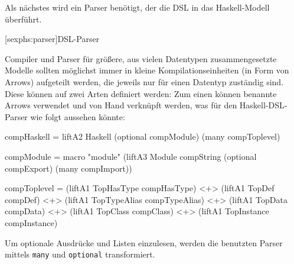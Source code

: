 \documentclass[12pt, a4paper, bibgerm]{scrbook}
\newenvironment{DIFnomarkup}{}{}
\newcommand\icode[1]{\lstinline?#1?}
\newcommand\lsection{}
\begin{document}
Als nächstes wird ein Parser benötigt, der die DSL in das
Haskell-Modell überführt.

\lsection[sexphs:parser]{DSL-Parser}

Compiler und Parser für größere, aus vielen Datentypen zusammengesetzte
Modelle sollten möglichst immer in kleine Kompilationseinheiten (in Form
von Arrows) aufgeteilt werden, die jeweils nur für einen Datentyp
zuständig sind. Diese können auf zwei Arten definiert werden: Zum einen
können benannte Arrows verwendet und von Hand verknüpft werden, was für
den Haskell-DSL-Parser wie folgt aussehen könnte:
\begin{DIFnomarkup}\begin{code}
compHaskell = liftA2 Haskell (optional compModule) (many compToplevel)

compModule = macro "module" (liftA3 Module
                                    compString
                                    (optional compExport)
                                    (many compImport))

compToplevel = (liftA1 TopHasType   compHasType)   <+>
               (liftA1 TopDef       compDef)       <+>
               (liftA1 TopTypeAlias compTypeAlias) <+>
               (liftA1 TopData      compData)      <+>
               (liftA1 TopClass     compClass)     <+>
               (liftA1 TopInstance  compInstance)
\end{code}\end{DIFnomarkup}
Um optionale Ausdrücke und Listen einzulesen, werden die benutzten Parser
mittels \icode{many} und \icode{optional} transformiert.
\end{document}
